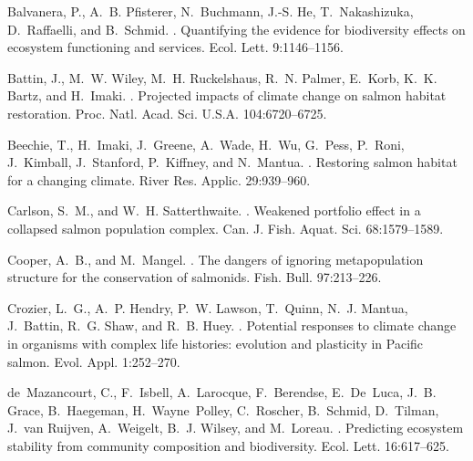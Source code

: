 \documentclass[12pt,english]{article}
\begin{document}
\begin{spacing}{1.9}
\begin{thebibliography}{64}
Balvanera, P., A.~B. Pfisterer, N.~Buchmann, J.-S. He, T.~Nakashizuka,
  D.~Raffaelli, and B.~Schmid.
.
\newblock Quantifying the evidence for biodiversity effects on ecosystem
  functioning and services.
\newblock Ecol. Lett. 9:1146--1156.

Battin, J., M.~W. Wiley, M.~H. Ruckelshaus, R.~N. Palmer, E.~Korb, K.~K. Bartz,
  and H.~Imaki.
.
\newblock Projected impacts of climate change on salmon habitat restoration.
\newblock Proc. Natl. Acad. Sci. U.S.A. 104:6720--6725.

Beechie, T., H.~Imaki, J.~Greene, A.~Wade, H.~Wu, G.~Pess, P.~Roni, J.~Kimball,
  J.~Stanford, P.~Kiffney, and N.~Mantua.
.
\newblock Restoring salmon habitat for a changing climate.
\newblock River Res. Applic. 29:939--960.

Carlson, S.~M., and W.~H. Satterthwaite.
.
\newblock Weakened portfolio effect in a collapsed salmon population complex.
\newblock Can. J. Fish. Aquat. Sci. 68:1579--1589.

Cooper, A.~B., and M.~Mangel.
.
\newblock The dangers of ignoring metapopulation structure for the conservation
  of salmonids.
\newblock Fish. Bull. 97:213--226.

Crozier, L.~G., A.~P. Hendry, P.~W. Lawson, T.~Quinn, N.~J. Mantua, J.~Battin,
  R.~G. Shaw, and R.~B. Huey.
.
\newblock Potential responses to climate change in organisms with complex life
  histories: evolution and plasticity in {Pacific} salmon.
\newblock Evol. Appl. 1:252--270.

de~Mazancourt, C., F.~Isbell, A.~Larocque, F.~Berendse, E.~De~Luca, J.~B.
  Grace, B.~Haegeman, H.~Wayne~Polley, C.~Roscher, B.~Schmid, D.~Tilman, J.~van
  Ruijven, A.~Weigelt, B.~J. Wilsey, and M.~Loreau.
.
\newblock Predicting ecosystem stability from community composition and
  biodiversity.
\newblock Ecol. Lett. 16:617--625.


\end{thebibliography}
\end{spacing}
\end{document}
